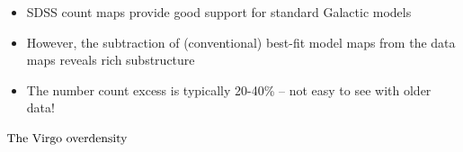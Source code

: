 \documentclass[letterpaper,landscape]{slides}
\begin{document}
\begin{slide}
{\begin{minipage}[t]{17cm}
\begin{itemize}
\item {\color{blue} SDSS count maps provide good support for standard 
Galactic models}
\item
However, the subtraction of (conventional) best-fit model maps from the 
data maps reveals {\color{blue} rich substructure} 
\item The number count excess is typically 20-40\% -- not easy to
see with older data!
\end{itemize}  
\vskip 0.1in
\vskip -4.8in
{\color{red} $\rm{The \,\, Virgo \,\, overdensity}$}

\end{minipage}}
\vfill 
\end{slide}
\end{document}
